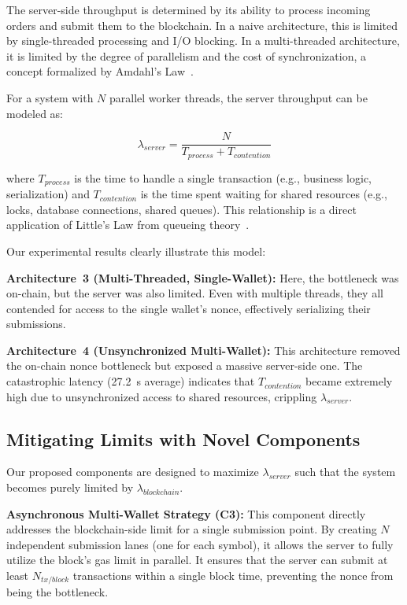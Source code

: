 The server-side throughput is determined by its ability to process incoming orders and submit them to the blockchain. In a naive architecture, this is limited by single-threaded processing and I/O blocking. In a multi-threaded architecture, it is limited by the degree of parallelism and the cost of synchronization, a concept formalized by Amdahl's Law~\cite{gustafson1988reevaluating}.

For a system with $N$ parallel worker threads, the server throughput can be modeled as:

\begin{equation}
\lambda_{server} = \frac{N}{T_{process} + T_{contention}}
\end{equation}

where $T_{process}$ is the time to handle a single transaction (e.g., business logic, serialization) and $T_{contention}$ is the time spent waiting for shared resources (e.g., locks, database connections, shared queues). This relationship is a direct application of Little's Law from queueing theory~\cite{little1961proof}.

Our experimental results clearly illustrate this model:

\textbf{Architecture~3 (Multi-Threaded, Single-Wallet):} Here, the bottleneck was on-chain, but the server was also limited. Even with multiple threads, they all contended for access to the single wallet's nonce, effectively serializing their submissions.

\textbf{Architecture~4 (Unsynchronized Multi-Wallet):} This architecture removed the on-chain nonce bottleneck but exposed a massive server-side one. The catastrophic latency (27.2~s average) indicates that $T_{contention}$ became extremely high due to unsynchronized access to shared resources, crippling $\lambda_{server}$.

\subsection{Mitigating Limits with Novel Components}

Our proposed components are designed to maximize $\lambda_{server}$ such that the system becomes purely limited by $\lambda_{blockchain}$.

\textbf{Asynchronous Multi-Wallet Strategy (C3):} This component directly addresses the blockchain-side limit for a single submission point. By creating $N$ independent submission lanes (one for each symbol), it allows the server to fully utilize the block's gas limit in parallel. It ensures that the server can submit at least $N_{tx/block}$ transactions within a single block time, preventing the nonce from being the bottleneck.


